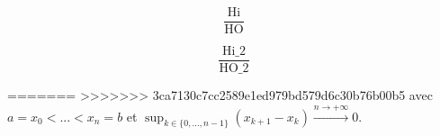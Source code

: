 \documentclass[a4paper,12pt]{article}
\begin{document}
	\begin{equation}
		\frac{\textrm{Hi}}{\textrm{HO}}
	\end{equation}	
	
	\begin{equation}
		\frac{\textrm{Hi_2}}{\textrm{HO_2}}
	\end{equation}	
	
=======
>>>>>>> 3ca7130c7cc2589e1ed979bd579d6c30b76b00b5
	avec $a = x_0 < ... < x_n = b$ et $\sup_{k \in \{0,...,  n-1\}}( x_{k+1}-x_{k}) \overset{n \rightarrow + \infty}{\longrightarrow} 0$.

\newpage
\fancyhead[L]{}


\end{document}
